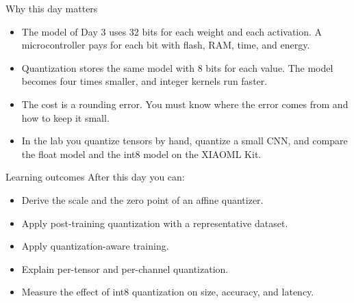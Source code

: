 \begin{frame}{Why this day matters}
  \begin{itemize}
    \item The model of Day 3 uses 32 bits for each weight and each activation.
          A microcontroller pays for each bit with flash, RAM, time, and
          energy.
    \item Quantization stores the same model with 8 bits for each value. The
          model becomes four times smaller, and integer kernels run faster.
    \item The cost is a rounding error. You must know where the error comes
          from and how to keep it small.
    \item In the lab you quantize tensors by hand, quantize a small CNN, and
          compare the float model and the int8 model on the XIAOML Kit.
  \end{itemize}
\end{frame}

\begin{frame}{Learning outcomes}
  After this day you can:
  \begin{itemize}
    \item Derive the scale and the zero point of an affine quantizer.
    \item Apply post-training quantization with a representative dataset.
    \item Apply quantization-aware training.
    \item Explain per-tensor and per-channel quantization.
    \item Measure the effect of int8 quantization on size, accuracy, and
          latency.
  \end{itemize}
\end{frame}
